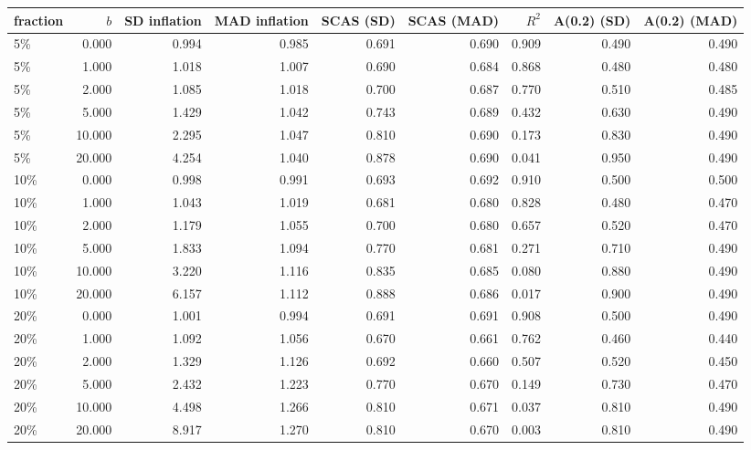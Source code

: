 \begin{tabular}{lrrrrrrrr}
\toprule
fraction & $b$ & SD inflation & MAD inflation & SCAS (SD) & SCAS (MAD) & $R^2$ & A(0.2) (SD) & A(0.2) (MAD) \\
\midrule
5\% & 0.000 & 0.994 & 0.985 & 0.691 & 0.690 & 0.909 & 0.490 & 0.490 \\
5\% & 1.000 & 1.018 & 1.007 & 0.690 & 0.684 & 0.868 & 0.480 & 0.480 \\
5\% & 2.000 & 1.085 & 1.018 & 0.700 & 0.687 & 0.770 & 0.510 & 0.485 \\
5\% & 5.000 & 1.429 & 1.042 & 0.743 & 0.689 & 0.432 & 0.630 & 0.490 \\
5\% & 10.000 & 2.295 & 1.047 & 0.810 & 0.690 & 0.173 & 0.830 & 0.490 \\
5\% & 20.000 & 4.254 & 1.040 & 0.878 & 0.690 & 0.041 & 0.950 & 0.490 \\
10\% & 0.000 & 0.998 & 0.991 & 0.693 & 0.692 & 0.910 & 0.500 & 0.500 \\
10\% & 1.000 & 1.043 & 1.019 & 0.681 & 0.680 & 0.828 & 0.480 & 0.470 \\
10\% & 2.000 & 1.179 & 1.055 & 0.700 & 0.680 & 0.657 & 0.520 & 0.470 \\
10\% & 5.000 & 1.833 & 1.094 & 0.770 & 0.681 & 0.271 & 0.710 & 0.490 \\
10\% & 10.000 & 3.220 & 1.116 & 0.835 & 0.685 & 0.080 & 0.880 & 0.490 \\
10\% & 20.000 & 6.157 & 1.112 & 0.888 & 0.686 & 0.017 & 0.900 & 0.490 \\
20\% & 0.000 & 1.001 & 0.994 & 0.691 & 0.691 & 0.908 & 0.500 & 0.490 \\
20\% & 1.000 & 1.092 & 1.056 & 0.670 & 0.661 & 0.762 & 0.460 & 0.440 \\
20\% & 2.000 & 1.329 & 1.126 & 0.692 & 0.660 & 0.507 & 0.520 & 0.450 \\
20\% & 5.000 & 2.432 & 1.223 & 0.770 & 0.670 & 0.149 & 0.730 & 0.470 \\
20\% & 10.000 & 4.498 & 1.266 & 0.810 & 0.671 & 0.037 & 0.810 & 0.490 \\
20\% & 20.000 & 8.917 & 1.270 & 0.810 & 0.670 & 0.003 & 0.810 & 0.490 \\
\bottomrule
\end{tabular}
